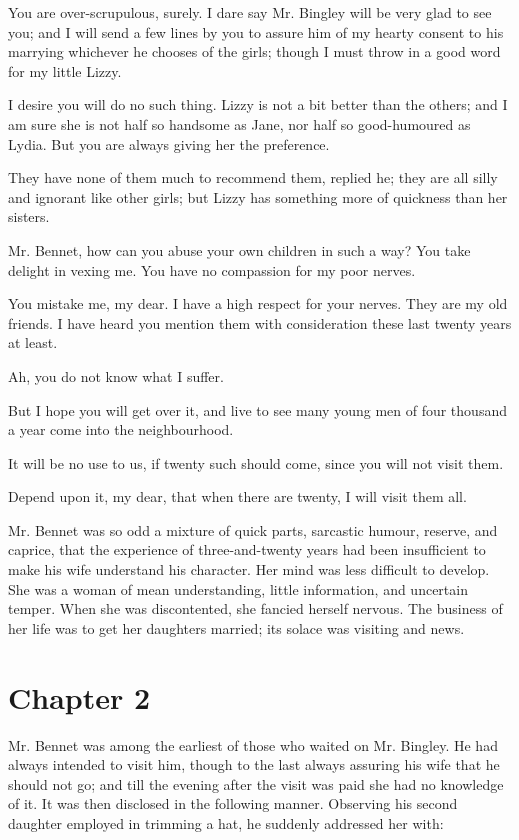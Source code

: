 \documentclass[twocolumn,DIV=7]{scrartcl}
\begin{document}
You are over-scrupulous, surely. I dare say Mr. Bingley will be very
glad to see you; and I will send a few lines by you to assure him of my
hearty consent to his marrying whichever he chooses of the girls; though
I must throw in a good word for my little Lizzy.

I desire you will do no such thing. Lizzy is not a bit better than the
others; and I am sure she is not half so handsome as Jane, nor half so
good-humoured as Lydia. But you are always giving her the preference.

They have none of them much to recommend them, replied he; they are
all silly and ignorant like other girls; but Lizzy has something more of
quickness than her sisters.

Mr. Bennet, how can you abuse your own children in such a way? You
take delight in vexing me. You have no compassion for my poor nerves.

You mistake me, my dear. I have a high respect for your nerves. They
are my old friends. I have heard you mention them with consideration
these last twenty years at least.

Ah, you do not know what I suffer.

But I hope you will get over it, and live to see many young men of four
thousand a year come into the neighbourhood.

It will be no use to us, if twenty such should come, since you will not
visit them.

Depend upon it, my dear, that when there are twenty, I will visit them
all.

Mr. Bennet was so odd a mixture of quick parts, sarcastic humour,
reserve, and caprice, that the experience of three-and-twenty years had
been insufficient to make his wife understand his character. Her mind
was less difficult to develop. She was a woman of mean understanding,
little information, and uncertain temper. When she was discontented,
she fancied herself nervous. The business of her life was to get her
daughters married; its solace was visiting and news.



\section{Chapter 2}


Mr. Bennet was among the earliest of those who waited on Mr. Bingley. He
had always intended to visit him, though to the last always assuring
his wife that he should not go; and till the evening after the visit was
paid she had no knowledge of it. It was then disclosed in the following
manner. Observing his second daughter employed in trimming a hat, he
suddenly addressed her with:
\end{document}
